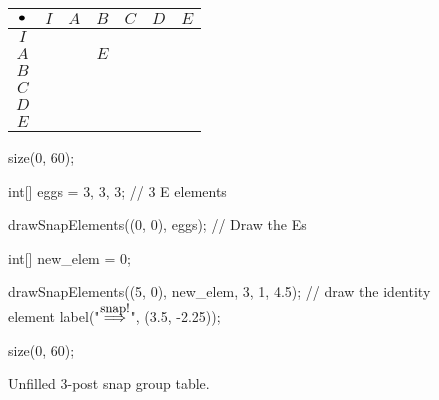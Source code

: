 \documentclass[../textbook.tex]{subfiles}
\begin{document}
\begin{figure}[h]
	\begin{center}
		\centering
		\begin{minipage}[b]{\textwidth}
			\centering
			\begin{tabular}{c|cccccc}
				\hline
				$\bullet$ & $I$ & $A$ & $B$ & $C$ & $D$ & $E$ \\ \hline
				\rowcolor{light-gray}
				$I$    &   &   &   &   &   &   \\
				$A$    &   &   & $E$ &   &   &   \\
				\rowcolor{light-gray}
				$B$    &   &   &   &   &   &   \\
				$C$    &   &   &   &   &   &   \\
				\rowcolor{light-gray}
				$D$    &   &   &   &   &   &   \\
				$E$    &   &   &   &   &   &   \\ \hline
			\end{tabular}
			\vspace*{0.5\baselineskip}
		\end{minipage}
	\end{center}
	\vspace*{-2\baselineskip}
	\begin{center}
		\begin{minipage}[t]{\textwidth}
			\caption{Unfilled $3$-post snap group table.}
			\label{fig:sbstable}
		\end{minipage}
	\end{center}

	\begin{center}
		\begin{minipage}[b]{.45\textwidth}
			\centering
			\begin{asy}[width=0.4\textwidth]
			size(0, 60);

			int[] eggs = {3, 3, 3}; // 3 E elements

			drawSnapElements((0, 0), eggs); // Draw the Es

			int[] new_elem = {0};

			drawSnapElements((5, 0), new_elem, 3, 1, 4.5); // draw the identity element
			label("$\stackrel{\mbox{\small snap!}}{\Longrightarrow}$", (3.5, -2.25));
			\end{asy}
		\end{minipage}
		\begin{minipage}[b]{.45\textwidth}
			\centering
			\begin{asy}[width=0.7\textwidth]
			size(0, 60);


\end{asy}
\end{minipage}
\end{center}
\end{figure}
\end{document}
